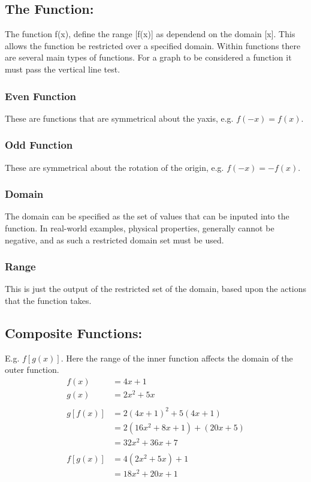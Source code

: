 \documentclass[a5paper]{article}
\begin{document}
	\subsection{The Function:}
	The function f(x), define the range [f(x)] as dependend on the domain [x]. This allows the function be restricted over a specified domain. Within functions there are several main types of functions. For a graph to be considered a function it must pass the vertical line test.
	\subsubsection{Even Function}
	These are functions that are symmetrical about the y\-axis, e.g. $f(-x)=f(x)$.
	\subsubsection{Odd Function}
	These are symmetrical about the rotation of the origin, e.g. $f(-x)=-f(x)$.
	\subsubsection{Domain}
	The domain can be specified as the set of values that can be inputed into the function. In real-world examples, physical properties, generally cannot be negative, and as such a restricted domain set must be used.
	\subsubsection{Range}
	This is just the output of the restricted set of the domain, based upon the actions that the function takes.

	\subsection{Composite Functions:}
	E.g. $f[g(x)]$. Here the range of the inner function affects the domain of the outer function.
	\begin{align*}
		f(x)&=4x+1\\
		g(x)&=2x^{2}+5x\\\\
		g[f(x)]&=2(4x+1)^{2}+5(4x+1)\\
		&=2(16x^{2}+8x+1)+(20x+5)\\
		&=32x^{2}+36x+7\\\\
		f[g(x)]&=4(2x^{2}+5x)+1\\
		&=18x^{2}+20x+1
	\end{align*}
\end{document}
